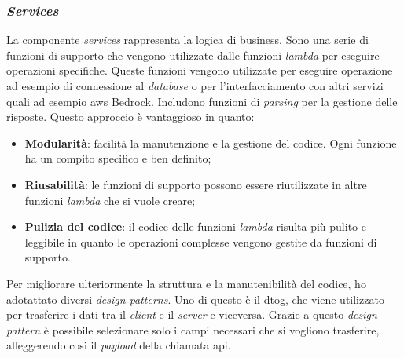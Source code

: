 \subsubsection{\textit{Services}}
La componente \textit{services} rappresenta la logica di business. Sono una serie di funzioni di supporto che vengono utilizzate dalle funzioni \textit{lambda} per eseguire operazioni specifiche. Queste funzioni vengono utilizzate per eseguire operazione ad esempio di connessione al \textit{database} o per l'interfacciamento con altri servizi quali ad esempio \gls{aws} Bedrock. Includono funzioni di \textit{parsing} per la gestione delle risposte. 
Questo approccio è vantaggioso in quanto:
\begin{itemize}
    \item \textbf{Modularità}: facilità la manutenzione e la gestione del codice. Ogni funzione ha un compito specifico e ben definito;
    \item \textbf{Riusabilità}: le funzioni di supporto possono essere riutilizzate in altre funzioni \textit{lambda} che si vuole creare;
    \item \textbf{Pulizia del codice}: il codice delle funzioni \textit{lambda} risulta più pulito e leggibile in quanto le operazioni complesse vengono gestite da funzioni di supporto.
\end{itemize}
\noindent
Per migliorare ulteriormente la struttura e la manutenibilità del codice, ho adotattato diversi \textit{design patterns}. Uno di questo è il \gls{dtog}, che viene utilizzato per trasferire i dati tra il \textit{client} e il \textit{server} e viceversa. Grazie a questo \textit{design pattern} è possibile selezionare solo i campi necessari che si vogliono trasferire, alleggerendo così il \textit{payload} della chiamata \gls{api}.

